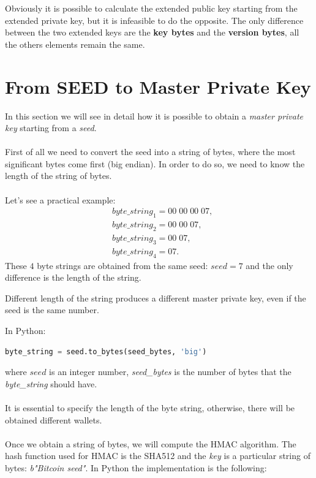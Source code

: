 \begin{remark}
	Obviously it is possible to calculate the extended public key starting from the extended private key, but it is infeasible to do the opposite. The only difference between the two extended keys are the \textbf{key bytes} and the \textbf{version bytes}, all the others elements remain the same.
\end{remark}

\section{From SEED to Master Private Key}
In this section we will see in detail how it is possible to obtain a \textit{master private key} starting from a \textit{seed}.
\\ \\
First of all we need to convert the seed into a string of bytes, where the most significant bytes come first (big endian). In order to do so, we need to know the length of the string of bytes. \\ \\
Let's see a practical example:
\begin{equation*}
\begin{split}
&byte\_string_1=00\; 00\; 00 \; 07, \\
&byte\_string_2=00\; 00\; 07, \\
&byte\_string_3=00\; 07, \\
&byte\_string_4=07.
\end{split}
\end{equation*}
These $4$ byte strings are obtained from the same seed: $seed=7$ and the only difference is the length of the string.
\begin{remark}
	Different length of the string produces a different master private key, even if the seed is the same number.
\end{remark}
In Python:
\begin{lstlisting}[language=Python]
byte_string = seed.to_bytes(seed_bytes, 'big')
\end{lstlisting}
where $seed$ is an integer number, \textit{seed\_bytes} is the number of bytes that the \textit{byte\_string} should have. 
\\ \\
It is essential to specify the length of the byte string, otherwise, there will be obtained different wallets. 
\\ \\
Once we obtain a string of bytes, we will compute the HMAC algorithm. The hash function used for HMAC is the SHA512 and the \textit{key} is a particular string of bytes: \textit{b"Bitcoin seed"}. In Python the implementation is the following:

